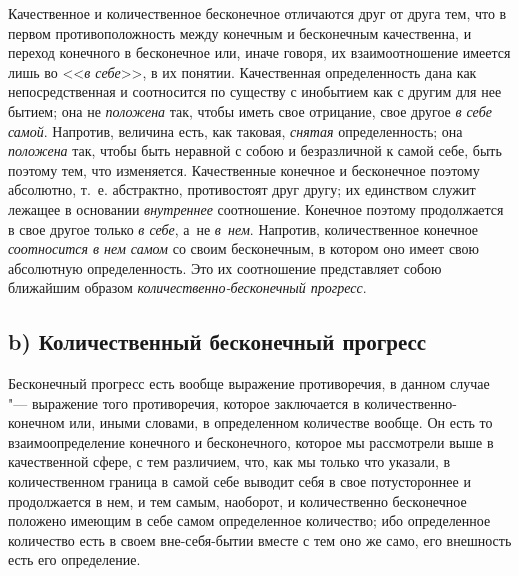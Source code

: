 Качественное и количественное бесконечное отличаются друг от друга тем, что
в первом противоположность между конечным и бесконечным качественна, и переход
конечного в бесконечное или, иначе говоря, их взаимоотношение имеется лишь во
<<{\em в себе}>>, в их понятии. Качественная определенность дана как
непосредственная и соотносится по существу с инобытием как с другим для нее
бытием; она не {\em положена} так, чтобы иметь свое отрицание, свое другое
{\em в себе самой}. Напротив, величина есть, как таковая, {\em снятая}
определенность; она {\em положена} так, чтобы быть неравной с собою и
безразличной к самой себе, быть поэтому тем, что изменяется. Качественные
конечное и бесконечное поэтому абсолютно, т.~е. абстрактно, противостоят друг
другу; их единством служит лежащее в основании {\em внутреннее} соотношение.
Конечное поэтому продолжается в свое другое только {\em в себе}, а~не
{\em в~нем}. Напротив, количественное конечное {\em соотносится в нем самом}
со своим бесконечным, в котором оно имеет свою абсолютную определенность. Это
их соотношение представляет собою ближайшим образом
{\em количественно-бесконечный прогресс}.

\subsection[b) Количественный бесконечный прогресс]%
{b) Количественный бесконечный прогресс}

Бесконечный прогресс есть вообще выражение противоречия, в данном случае "---
выражение того противоречия, которое заключается в количественно-конечном или,
иными словами, в определенном количестве вообще. Он есть то взаимоопределение
конечного и бесконечного, которое мы рассмотрели выше в качественной сфере,
с тем различием, что, как мы только что указали, в количественном граница
в самой себе выводит себя в свое потустороннее и продолжается в нем, и тем
самым, наоборот, и количественно бесконечное положено имеющим в себе самом
определенное количество; ибо определенное количество есть в своем
вне-себя-бытии вместе с тем оно же само, его внешность есть его определение.

